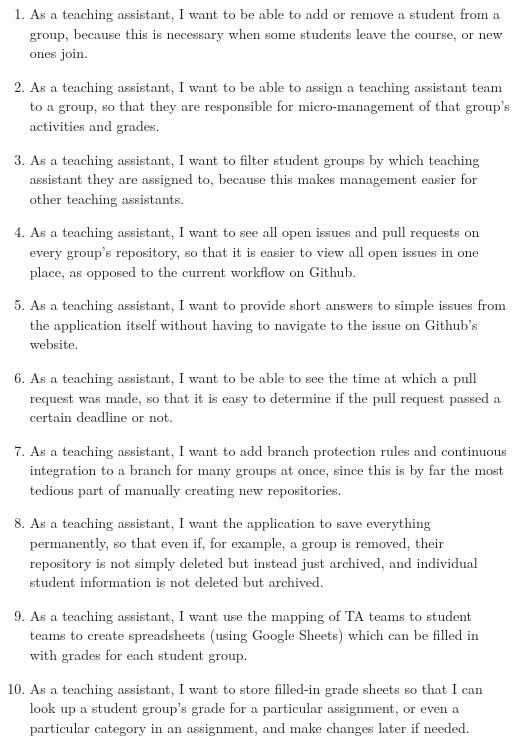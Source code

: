\documentclass{article}
\begin{document}
\begin{enumerate}
				\item As a teaching assistant, I want to be able to add or remove a student from a group, because this is necessary when some students leave the course, or new ones join.
				
				\item As a teaching assistant, I want to be able to assign a teaching assistant team to a group, so that they are responsible for micro-management of that group's activities and grades.
				
				\item As a teaching assistant, I want to filter student groups by which teaching assistant they are assigned to, because this makes management easier for other teaching assistants.
				
				\item As a teaching assistant, I want to see all open issues and pull requests on every group's repository, so that it is easier to view all open issues in one place, as opposed to the current workflow on Github.
				
				\item As a teaching assistant, I want to provide short answers to simple issues from the application itself without having to navigate to the issue on Github's website.
				
				\item As a teaching assistant, I want to be able to see the time at which a pull request was made, so that it is easy to determine if the pull request passed a certain deadline or not.
				
				\item As a teaching assistant, I want to add branch protection rules and continuous integration to a branch for many groups at once, since this is by far the most tedious part of manually creating new repositories.
				
				\item As a teaching assistant, I want the application to save everything permanently, so that even if, for example, a group is removed, their repository is not simply deleted but instead just archived, and individual student information is not deleted but archived.
				
				\item As a teaching assistant, I want use the mapping of TA teams to student teams to create spreadsheets (using Google Sheets) which can be filled in with grades for each student group.
				
				\item As a teaching assistant, I want to store filled-in grade sheets so that I can look up a student group's grade for a particular assignment, or even a particular category in an assignment, and make changes later if needed.
				

\end{enumerate}
\end{document}
